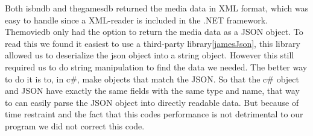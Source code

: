 Both isbndb and thegamesdb returned the media data in XML format, which was easy to handle since a XML-reader is included in the .NET framework. Themoviedb only had the option to return the media data as a JSON object. To read this we found it easiest to use a third-party library\ref{jamesJson}, this library allowed us to deserialize the json object into a string object. However this still required us to do string manipulation to find the data we needed. The better way to do it is to, in c#, make objects that match the JSON. So that the c# object and JSON have exactly the same fields with the same type and name, that way to can easily parse the JSON object into directly readable data. But because of time restraint and the fact that this codes performance is not detrimental to our program we did not correct this code.



